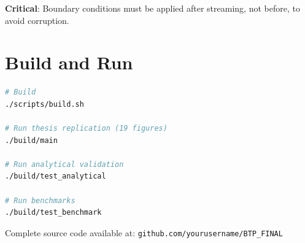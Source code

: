 \textbf{Critical}: Boundary conditions must be applied after streaming, not before, to avoid corruption.

\section{Build and Run}

\begin{lstlisting}[language=bash, numbers=none]
# Build
./scripts/build.sh

# Run thesis replication (19 figures)
./build/main

# Run analytical validation
./build/test_analytical

# Run benchmarks
./build/test_benchmark
\end{lstlisting}

Complete source code available at: \texttt{github.com/yourusername/BTP\_FINAL}
